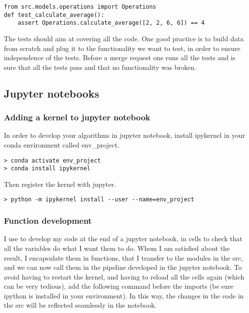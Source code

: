 \documentclass[24pt]{article}
\begin{document}
\begin{lstlisting}
from src.models.operations import Operations
def test_calculate_average():
    assert Operations.calculate_average([2, 2, 6, 6]) == 4
\end{lstlisting}


The tests should aim at covering all the code. One good practice is to build data from scratch and plug it to the functionality we want to test, in order to ensure independence of the tests. Before a merge request one runs all the tests and is sure that all the tests pass and that no functionality was broken. 





\subsection{Jupyter notebooks}

\subsubsection{Adding a kernel to jupyter notebook}

In order to develop your algorithms in jupyter notebook, install ipykernel in your conda environment called env\_project.
\begin{lstlisting}
> conda activate env_project
> conda install ipykernel
\end{lstlisting}

Then register the kernel with jupyter.

\begin{lstlisting}
> python -m ipykernel install --user --name=env_project
\end{lstlisting}

\subsubsection{Function development}

I use to develop my code at the end of a jupyter notebook, in cells to check that all the variables do what I want them to do. Whem I am satisfied about the result, I encapsulate them in functions, that I transfer to the modules in the src, and we can now call them in the  pipeline developed in the jupyter notebook. To avoid having to restart the kernel, and having to reload all the cells again (which can be very tedious), add the following command before the imports (be sure ipython is installed in your environment).
In this way, the changes in the code in the src will be reflected seamlessly in the notebook.
\end{document}
